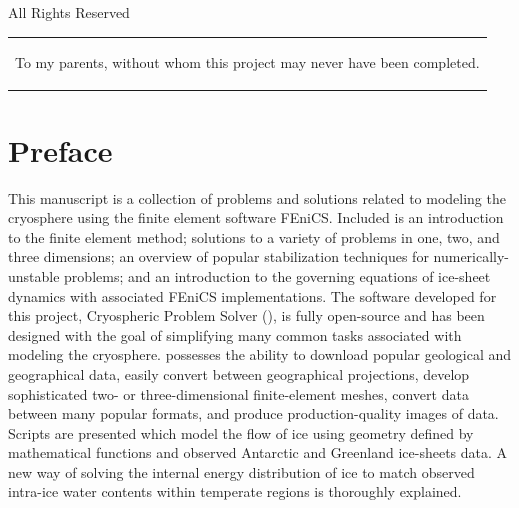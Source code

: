 \begin{titlepage}
\begin{center}
  \vspace{5mm}
  
  \the\year
  
  \vspace{5mm}
  
  All Rights Reserved
  
  \end{center}
  
  \newpage
  
  \begin{table}[t]
  \centering
  \begin{tabular}{p{50mm}}
    \begin{flushleft}
      To my parents, without whom this project may never have been completed.
    \end{flushleft}
  \end{tabular}
  \end{table}

\end{titlepage}

\pagestyle{headings}

\tableofcontents
 
\listoffigures
{}
\listoftables
{}
\listofalgorithms

\setcounter{tocdepth}{-1}
\setcounter{tocdepth}{3}
\markboth{}{} %

\chapter*{Preface}

  This manuscript is a collection of problems and solutions related to modeling the cryosphere using the finite element software FEniCS.  Included is an introduction to the finite element method; solutions to a variety of problems in one, two, and three dimensions; an overview of popular stabilization techniques for numerically-unstable problems; and an introduction to the governing equations of ice-sheet dynamics with associated FEniCS implementations.  The software developed for this project, Cryospheric Problem Solver (\CSLVR), is fully open-source and has been designed with the goal of simplifying many common tasks associated with modeling the cryosphere.  \CSLVR possesses the ability to download popular geological and geographical data, easily convert between geographical projections, develop sophisticated two- or three-dimensional finite-element meshes, convert data between many popular formats, and produce production-quality images of data.  Scripts are presented which model the flow of ice using geometry defined by mathematical functions and observed Antarctic and Greenland ice-sheets data.  A new way of solving the internal energy distribution of ice to match observed intra-ice water contents within temperate regions is thoroughly explained.


